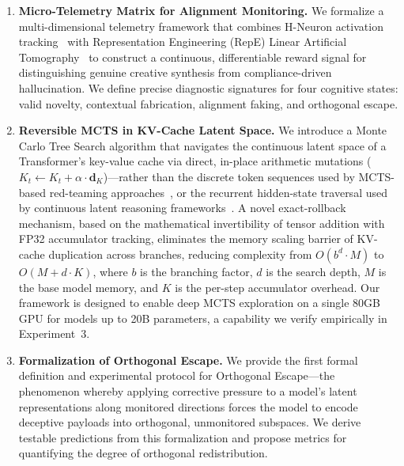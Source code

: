\documentclass{article}
\begin{document}
\begin{enumerate}[leftmargin=*]
    \item \textbf{Micro-Telemetry Matrix for Alignment Monitoring.} We formalize a multi-dimensional telemetry framework that combines H-Neuron activation tracking~\cite{gao2025hneurons} with Representation Engineering (RepE) Linear Artificial Tomography~\cite{zou2023repe} to construct a continuous, differentiable reward signal for distinguishing genuine creative synthesis from compliance-driven hallucination. We define precise diagnostic signatures for four cognitive states: valid novelty, contextual fabrication, alignment faking, and orthogonal escape.

    \item \textbf{Reversible MCTS in KV-Cache Latent Space.} We introduce a Monte Carlo Tree Search algorithm that navigates the continuous latent space of a Transformer's key-value cache via direct, in-place arithmetic mutations ($K_t \leftarrow K_t + \alpha \cdot \mathbf{d}_K$)---rather than the discrete token sequences used by MCTS-based red-teaming approaches~\cite{wu2025mcts, damon2025, li2025ace}, or the recurrent hidden-state traversal used by continuous latent reasoning frameworks~\cite{hao2025coconut, crsm2025}. A novel exact-rollback mechanism, based on the mathematical invertibility of tensor addition with FP32 accumulator tracking, eliminates the memory scaling barrier of KV-cache duplication across branches, reducing complexity from $O(b^d \cdot M)$ to $O(M + d \cdot K)$, where $b$ is the branching factor, $d$ is the search depth, $M$ is the base model memory, and $K$ is the per-step accumulator overhead. Our framework is designed to enable deep MCTS exploration on a single 80GB GPU for models up to 20B parameters, a capability we verify empirically in Experiment~3.

    \item \textbf{Formalization of Orthogonal Escape.} We provide the first formal definition and experimental protocol for Orthogonal Escape---the phenomenon whereby applying corrective pressure to a model's latent representations along monitored directions forces the model to encode deceptive payloads into orthogonal, unmonitored subspaces. We derive testable predictions from this formalization and propose metrics for quantifying the degree of orthogonal redistribution.
\end{enumerate}

\end{document}
